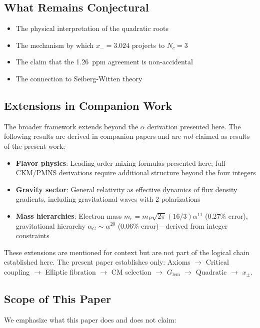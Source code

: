 \documentclass[11pt,a4paper]{article}
\theoremstyle{definition}
\theoremstyle{remark}
\newcommand{\Glem}{G_{\text{lem}}}
\begin{document}
\subsection{What Remains Conjectural}

\begin{itemize}
    \item The physical interpretation of the quadratic roots
    \item The mechanism by which $x_- = 3.024$ projects to $N_c = 3$
    \item The claim that the 1.26~ppm agreement is non-accidental
    \item The connection to Seiberg-Witten theory
\end{itemize}

\subsection{Extensions in Companion Work}

The broader framework extends beyond the $\alpha$ derivation presented here. The following results are derived in companion papers and are \emph{not} claimed as results of the present work:

\begin{itemize}
    \item \textbf{Flavor physics}: Leading-order mixing formulas presented here; full CKM/PMNS derivations require additional structure beyond the four integers
    \item \textbf{Gravity sector}: General relativity as effective dynamics of flux density gradients, including gravitational waves with 2 polarizations
    \item \textbf{Mass hierarchies}: Electron mass $m_e = m_P \sqrt{2\pi} (16/3) \alpha^{11}$ (0.27\% error), gravitational hierarchy $\alpha_G \sim \alpha^{20}$ (0.06\% error)---derived from integer constraints
\end{itemize}

These extensions are mentioned for context but are not part of the logical chain established here. The present paper establishes only: Axioms $\to$ Critical coupling $\to$ Elliptic fibration $\to$ CM selection $\to$ $\Glem$ $\to$ Quadratic $\to$ $x_\pm$.

\subsection{Scope of This Paper}

We emphasize what this paper does and does not claim:
\end{document}
